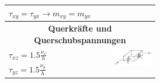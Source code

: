 \begin{minipage}{0.65\linewidth}
\begin{tabular}{|lp{0.3\linewidth}|}
					$ \tau_{xy} = \tau_{yx} \rightarrow m_{xy} = m_{yx} $		& \\ \hline
					
					
					\multicolumn{2}{c}{\textbf{Querkräfte und Querschubspannungen}} \\
					
					$ \tau_{xz} = 1.5 \frac{\nu_x}{h} $		& \multirow{2}{*}{\includegraphics[width=\linewidth]{images/DW3Quer.PNG}} \\
					
					$ \tau_{yz} = 1.5 \frac{\nu_y}{h} $		& \\ \hline
					
			\end{tabular}
		
		
	\end{minipage}

